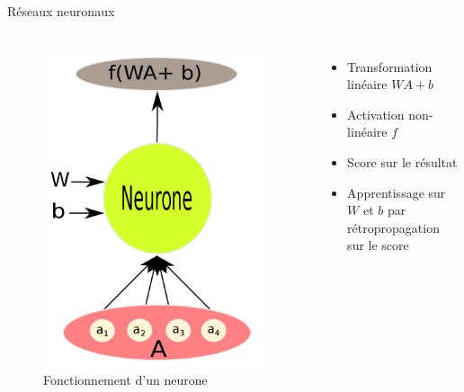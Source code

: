 \documentclass{beamer}
\begin{document}
\begin{frame}{Réseaux neuronaux}

  \begin{columns}
    \begin{figure}
      \centering
      \includegraphics[scale=0.10]{../Figures/Neuron}
      \caption{Fonctionnement d'un neurone}
    \end{figure}

    \begin{itemize}
    \item Transformation linéaire $WA + b$\pause
    \item Activation non-linéaire $f$ \pause
    \item Score sur le résultat \pause
    \item Apprentissage sur $W$ et $b$ par rétropropagation sur le score
    \end{itemize}
  \end{columns}

\end{frame}
\end{document}
